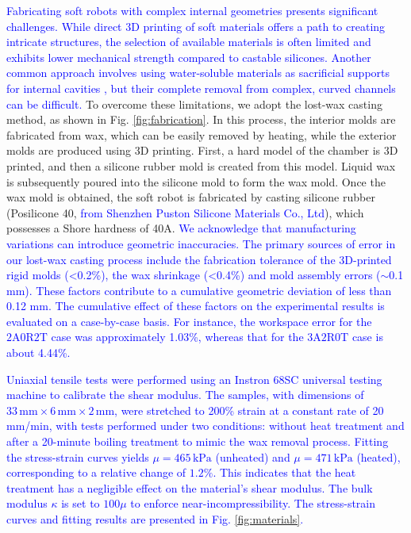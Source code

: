 \documentclass[journal]{IEEEtran}
\theoremstyle{definition}
\begin{document}
\textcolor{blue}{Fabricating soft robots with complex internal geometries presents significant challenges. While direct 3D printing of soft materials offers a path to creating intricate structures, the selection of available materials is often limited and exhibits lower mechanical strength compared to castable silicones. Another common approach involves using water-soluble materials as sacrificial supports for internal cavities \cite{Silva_Fonseca_Neto_Babcinschi_Neto_2024}, but their complete removal from complex, curved channels can be difficult.} To overcome these limitations, we adopt the lost-wax casting method, as shown in Fig. \ref{fig:fabrication}. In this process, the interior molds are fabricated from wax, which can be easily removed by heating, while the exterior molds are produced using 3D printing. First, a hard model of the chamber is 3D printed, and then a silicone rubber mold is created from this model. Liquid wax is subsequently poured into the silicone mold to form the wax mold. Once the wax mold is obtained, the soft robot is fabricated by casting silicone rubber (Posilicone 40, \textcolor{blue}{from Shenzhen Puston Silicone Materials Co., Ltd}), which possesses a Shore hardness of 40A. \textcolor{blue}{We acknowledge that manufacturing variations can introduce geometric inaccuracies. The primary sources of error in our lost-wax casting process include the fabrication tolerance of the 3D-printed rigid molds (<0.2\%), the wax shrinkage (<0.4\%) and mold assembly errors ($\sim$0.1 mm). These factors contribute to a cumulative geometric deviation of less than 0.12 mm. The cumulative effect of these factors on the experimental results is evaluated on a case-by-case basis. For instance, the workspace error for the $2\text{A}0\text{R}2\text{T}$ case was approximately 1.03\%, whereas that for the $3\text{A}2\text{R}0\text{T}$ case is about 4.44\%.}

\textcolor{blue}{Uniaxial tensile tests were performed using an Instron 68SC universal testing machine to calibrate the shear modulus. The samples, with dimensions of $33\,\text{mm} \times 6\,\text{mm} \times 2\,\text{mm}$, were stretched to 200\% strain at a constant rate of 20 mm/min, with tests performed under two conditions: without heat treatment and after a 20-minute boiling treatment to mimic the wax removal process. Fitting the stress-strain curves yields $\mu = 465\,\text{kPa}$ (unheated) and $\mu = 471\,\text{kPa}$ (heated), corresponding to a relative change of $1.2\%$. This indicates that the heat treatment has a negligible effect on the material's shear modulus. The bulk modulus $\kappa$ is set to $100\mu$ to enforce near-incompressibility. The stress-strain curves and fitting results are presented in Fig. \ref{fig:materials}.}
\end{document}
